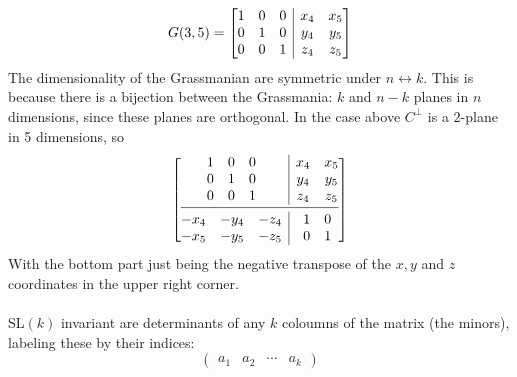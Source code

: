 \documentclass[a4paper,12pt]{article}
\begin{document}
\begin{equation}G(3,5) = 
\left[ \begin{array}{@{}c|c@{}}
	\begin{matrix}
		1 & 0 &  0 \\
		0 & 1 &  0 \\
		0 & 0 &  1 \\
	\end{matrix} 
	& 	\begin{matrix}
		x_4 & x_5  \\
		y_4 & y_5  \\
		z_4 & z_5  \\
	\end{matrix}  \\
\end{array} \right]
\end{equation}
The dimensionality of the Grassmanian are symmetric under $n\leftrightarrow k$. This is because there is a bijection between the Grassmania: $k$ and $n-k$ planes in $n$ dimensions, since these planes are orthogonal. In the case above $C^{\perp}$ is a $2$-plane in 5 dimensions, so
\begin{equation}
	\left[ \begin{array}{@{}c|c@{}}
		\begin{matrix}
			1 & 0 &  0 \\
			0 & 1 &  0 \\
			0 & 0 &  1 \\
		\end{matrix} 
		& 	\begin{matrix}
			x_4 & x_5  \\
			y_4 & y_5  \\
			z_4 & z_5  \\
		\end{matrix}  \\
	\cmidrule[0.4pt]{1-2}
		\begin{matrix}
		-x_4 & -y_4 & -z_4  \\
		-x_5 & -y_5 & -z_5 \\
	\end{matrix} 
	& 	\begin{matrix}
	1 & 0  \\
	0 & 1  \\
\end{matrix} 
	\end{array} \right]
\end{equation}
With the bottom part just being the negative transpose of the $x,y$ and $z$ coordinates in the upper right corner. \\\\
SL$(k)$ invariant are determinants of any $k$ coloumns of the matrix (the minors), labeling these by their indices:
\begin{equation}
\begin{pmatrix}
a_1&a_2&\cdots &a_k
\end{pmatrix}
\end{equation}
\newpage
\end{document}
